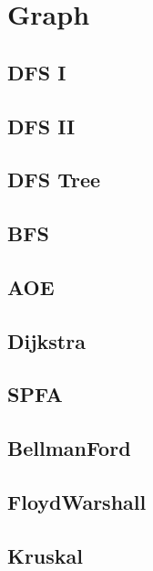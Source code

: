\section{Graph}

\subsection{DFS I}


\subsection{DFS II}


\subsection{DFS Tree}


\subsection{BFS}


\subsection{AOE}


\subsection{Dijkstra}


\subsection{SPFA}


\subsection{BellmanFord}


\subsection{FloydWarshall}


\subsection{Kruskal}


